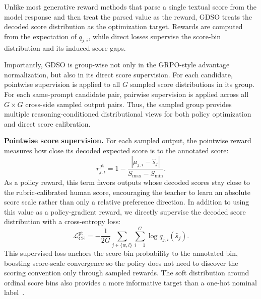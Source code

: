 \documentclass{article}
\newcommand{\teaname}{GDSO\xspace}
\begin{document}
Unlike most generative reward methods that parse a single textual score from the model response and then treat the parsed value as the reward, \teaname treats the decoded score distribution as the optimization target. Rewards are computed from the expectation of $q_{j,i}$, while direct losses supervise the score-bin distribution and its induced score gaps.

Importantly, \teaname is group-wise not only in the GRPO-style advantage normalization, but also in its direct score supervision. For each candidate, pointwise supervision is applied to all $G$ sampled score distributions in its group. For each same-prompt candidate pair, pairwise supervision is applied across all $G \times G$ cross-side sampled output pairs. Thus, the sampled group provides multiple reasoning-conditioned distributional views for both policy optimization and direct score calibration.

\textbf{Pointwise score supervision.}
For each sampled output, the pointwise reward measures how close its decoded expected score is to the annotated score:
\begin{equation}
r^{\mathrm{pt}}_{j,i}
=
1 -
\frac{\left|\mu_{j,i}-\hat{s}_j\right|}{S_{\max}-S_{\min}}.
\label{eq:pointwise-reward}
\end{equation}
As a policy reward, this term favors outputs whose decoded scores stay close to the rubric-calibrated human score, encouraging the teacher to learn an absolute score scale rather than only a relative preference direction. In addition to using this value as a policy-gradient reward, we directly supervise the decoded score distribution with a cross-entropy loss:
\begin{equation}
\mathcal{L}^{\mathrm{pt}}_{\mathrm{CE}}
=
-\frac{1}{2G}
\sum_{j \in \{w,l\}}\sum_{i=1}^{G}
\log q_{j,i}(\hat{s}_j).
\label{eq:pointwise-ce}
\end{equation}
This supervised loss anchors the score-bin probability to the annotated bin, boosting score-scale convergence so the policy does not need to discover the scoring convention only through sampled rewards. The soft distribution around ordinal score bins also provides a more informative target than a one-hot nominal label~\cite{diaz2019soft,wen2023ordinal}.
\end{document}
